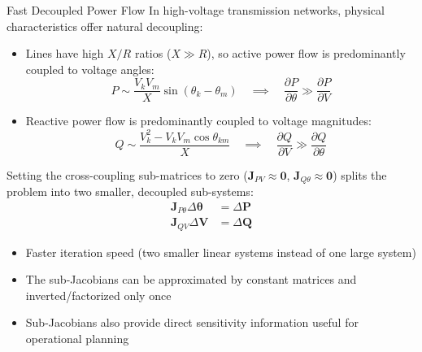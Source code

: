 \begin{frame}[allowframebreaks]{Fast Decoupled Power Flow}
    In high-voltage transmission networks, physical characteristics offer natural decoupling:
    \begin{itemize}
        \item Lines have high $X/R$ ratios ($X \gg R$), so active power flow is predominantly coupled to voltage angles:
        $$P \sim \frac{V_k V_m}{X} \sin(\theta_k - \theta_m) \quad \implies \quad \frac{\partial P}{\partial \theta} \gg \frac{\partial P}{\partial V}$$
        \item Reactive power flow is predominantly coupled to voltage magnitudes:
        $$Q \sim \frac{V_k^2 - V_k V_m \cos\theta_{km}}{X} \quad \implies \quad \frac{\partial Q}{\partial V} \gg \frac{\partial Q}{\partial \theta}$$
    \end{itemize}
    
    \newpage
    Setting the cross-coupling sub-matrices to zero ($\mathbf{J}_{PV} \approx \mathbf{0}$, $\mathbf{J}_{Q\theta} \approx \mathbf{0}$) splits the problem into two smaller, decoupled sub-systems:
    \begin{align}
        \mathbf{J}_{P\theta} \Delta \boldsymbol{\theta} &= \Delta \mathbf{P} \\
        \mathbf{J}_{QV} \Delta \mathbf{V} &= \Delta \mathbf{Q}
    \end{align}
    
    \begin{itemize}
        \item Faster iteration speed (two smaller linear systems instead of one large system)
        \item The sub-Jacobians can be approximated by constant matrices and inverted/factorized only once
        \item Sub-Jacobians also provide direct sensitivity information useful for operational planning
    \end{itemize}
\end{frame}

